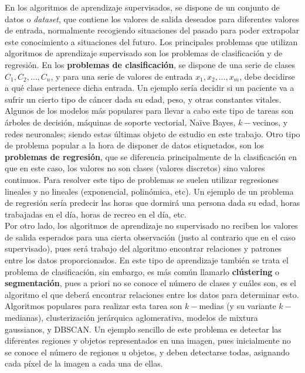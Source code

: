		En los algoritmos de aprendizaje supervisados, se dispone de un conjunto de datos o \textit{dataset}, que contiene los valores de salida deseados para diferentes valores de entrada, normalmente recogiendo situaciones del pasado para poder extrapolar este conocimiento a situaciones del futuro. Los principales problemas que utilizan algoritmos de aprendizaje supervisado son los problemas de clasificación y de regresión. En los \textbf{problemas de clasificación}, se dispone de una serie de clases $C_1, C_2, \hdots, C_n$, y para una serie de valores de entrada $x_1, x_2, \hdots, x_m$, debe decidirse a qué clase pertenece dicha entrada. Un ejemplo sería decidir si un paciente va a sufrir un cierto tipo de cáncer dada su edad, peso, y otras constantes vitales. Algunos de los modelos más populares para llevar a cabo este tipo de tareas son árboles de decisión, máquinas de soporte vectorial, Naïve Bayes, $k-$vecinos, y redes neuronales; siendo estas últimas objeto de estudio en este trabajo. Otro tipo de problema popular a la hora de disponer de datos etiquetados, son los \textbf{problemas de regresión}, que se diferencia principalmente de la clasificación en que en este caso, los valores no son clases (valores discretos) sino valores continuos. Para resolver este tipo de problemas se suelen utilizar regresiones lineales y no lineales (exponencial, polinómica, etc). Un ejemplo de un problema de regresión sería predecir las horas que dormirá una persona dada su edad, horas trabajadas en el día, horas de recreo en el día, etc. \\
		
		Por otro lado, los algoritmos de aprendizaje no supervisado no reciben los valores de salida esperados para una cierta observación (justo al contrario que en el caso supervisado), pues será trabajo del algoritmo encontrar relaciones y patrones entre los datos proporcionados. En este tipo de aprendizaje también se trata el problema de clasificación, sin embargo, es más común llamarlo \textbf{clústering} o \textbf{segmentación}, pues a priori no se conoce el número de clases y cuáles son, es el algoritmo el que deberá encontrar relaciones entre los datos para determinar esto. Algoritmos populares para realizar esta tarea son $k-$medias (y su variante $k-$medianas), clusterización jerárquica aglomerativa, modelos de mixtura gaussianos, y DBSCAN. Un ejemplo sencillo de este problema es detectar las diferentes regiones y objetos representados en una imagen, pues inicialmente no se conoce el número de regiones u objetos, y deben detectarse todas, asignando cada píxel de la imagen a cada una de ellas. 

